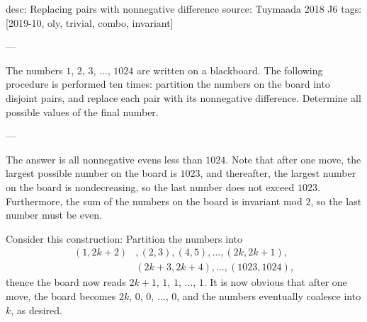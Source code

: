 desc: Replacing pairs with nonnegative difference
source: Tuymaada 2018 J6
tags: [2019-10, oly, trivial, combo, invariant]

---

The numbers $1$, $2$, $3$, $\ldots$, $1024$ are written on a blackboard. The following procedure is performed ten times: partition the numbers on the board into disjoint pairs, and replace each pair with its nonnegative difference. Determine all possible values of the final number.

---

The answer is all nonnegative evens less than $1024$. Note that after one move, the largest possible number on the board is $1023$, and thereafter, the largest number on the board is nondecreasing, so the last number does not exceed $1023$. Furthermore, the sum of the numbers on the board is invariant mod $2$, so the last number must be even.

Consider this construction: Partition the numbers into
\begin{align*}
    (1,2k+2)&,(2,3),(4,5),\ldots,(2k,2k+1),\\ &(2k+3,2k+4),\ldots,(1023,1024),
\end{align*}
thence the board now reads $2k+1$, $1$, $1$, $\ldots$, $1$. It is now obvious that after one move, the board becomes $2k$, $0$, $0$, $\ldots$, $0$, and the numbers eventually coalesce into $k$, as desired.
